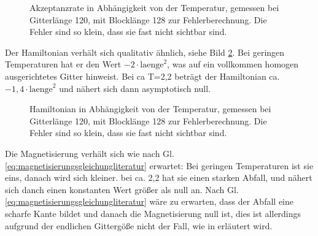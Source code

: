 \documentclass{scrreprt}
\begin{document}
	\begin{figure}[htbp]
		\begin{minipage}{0.48\textwidth}
			
		\end{minipage}
		\begin{minipage}{0.48\textwidth}
			
		\end{minipage}
		\caption[Akzeptanzrate in Abhängigkeit von der Temperatur]{Akzeptanzrate in Abhängigkeit von der Temperatur, gemessen bei Gitterlänge 120, mit Blocklänge 128 zur Fehlerberechnung. Die Fehler sind so klein, dass sie fast nicht sichtbar sind.}
		\label{fig:ergebnisakzeptanzrate}
	\end{figure}
	
	Der Hamiltonian verhält sich qualitativ ähnlich, siehe Bild \ref{fig:ergebnishamiltonian}. Bei geringen Temperaturen hat er den Wert $-2\cdot\text{laenge}^2$, was auf ein vollkommen homogen ausgerichtetes Gitter hinweist. Bei ca T=2,2 beträgt der Hamiltonian ca. $-1,4\cdot\text{laenge}^2$ und nähert sich dann asymptotisch null.
	
	\begin{figure}[htbp]
		\begin{minipage}{0.48\textwidth}
			
		\end{minipage}
		\begin{minipage}{0.48\textwidth}
			
		\end{minipage}
		\caption[Hamiltonian in Abhängigkeit von der Temperatur]{Hamiltonian in Abhängigkeit von der Temperatur, gemessen bei Gitterlänge 120, mit Blocklänge 128 zur Fehlerberechnung. Die Fehler sind so klein, dass sie fast nicht sichtbar sind.}
		\label{fig:ergebnishamiltonian}
	\end{figure}
	

	Die Magnetisierung verhält sich wie nach Gl. \ref{eq:magnetisierungsgleichungliteratur} erwartet: Bei geringen Temperaturen ist sie eins, danach wird sich kleiner. bei ca. 2,2 hat sie einen starken Abfall, und nähert sich danch einen konstanten Wert größer als null an. Nach Gl. \ref{eq:magnetisierungsgleichungliteratur} wäre zu erwarten, dass der Abfall eine scharfe Kante bildet und danach die Magnetisierung null ist, dies ist allerdings aufgrund der endlichen Gittergöße nicht der Fall, wie in \cite{binderheermann} erläutert wird.
\end{document}
